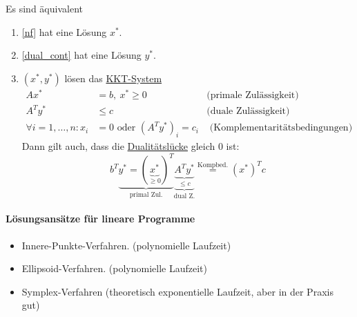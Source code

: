 \begin{lemma} \label{thm:starke_dualitat}
  Es sind äquivalent
  \begin{enumerate}
    \item \eqref{nf} hat eine Lösung $x^*$.
    \item \eqref{dual_cont} hat eine Lösung $y^*$.
    \item $(x^*,y^*)$ lösen das \underline{KKT-System}
      \begin{align*}
        Ax^* &= b , \ x^* \geq 0 & \text{(primale Zulässigkeit)}\\
        A^{T} y^* &\leq c & \text{(duale Zulässigkeit)}\\
        \forall i = 1,\dots , n: x_{i}&= 0 \text{ oder } \left(A^{T}y^*  \right)_{i} = c_{i} & \text{ (Komplementaritätsbedingungen)}
      \end{align*}
      Dann gilt auch, dass die \underline{Dualitätslücke} gleich $0$ ist:
      \begin{equation*}
        b^{T}\underbrace{y^* = (\underbrace{x^*}_{\geq 0})^{T}}_{\text{primal Zul.}} \underbrace{\underbrace{A^{T} y^*}_{\leq c }}_{\text{dual Z.}} \stackrel{\text{Kompbed.}}= \left(x^*\right)^{T} c
      \end{equation*}
    \end{enumerate}
\end{lemma} %
\paragraph{Lösungsansätze für lineare Programme}
\begin{itemize}
  \item Innere-Punkte-Verfahren. (polynomielle Laufzeit)
  \item Ellipsoid-Verfahren. (polynomielle Laufzeit)
  \item Symplex-Verfahren (theoretisch exponentielle Laufzeit, aber in der Praxis gut)
\end{itemize}
